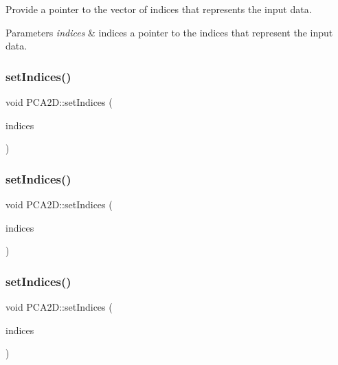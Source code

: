Provide a pointer to the vector of indices that represents the input data. 


\begin{DoxyParams}{Parameters}
{\em indices} & indices a pointer to the indices that represent the input data. \\
\hline
\end{DoxyParams}
\mbox{\label{classPCA2D_a0b214db07c98537f683bb69a7e9d9271}} 
\subsubsection{\texorpdfstring{set\+Indices()}{setIndices()}\hspace{0.1cm}{\footnotesize\ttfamily [7/10]}}
{\footnotesize\ttfamily void P\+C\+A2\+D\+::set\+Indices (\begin{DoxyParamCaption}\item[{const pcl\+::\+Point\+Indices\+Ptr \&}]{indices }\end{DoxyParamCaption})\hspace{0.3cm}{\ttfamily [inline]}}

\mbox{\label{classPCA2D_a51c7a6bcf7c77af6d81d98a0bb0186a6}} 
\subsubsection{\texorpdfstring{set\+Indices()}{setIndices()}\hspace{0.1cm}{\footnotesize\ttfamily [8/10]}}
{\footnotesize\ttfamily void P\+C\+A2\+D\+::set\+Indices (\begin{DoxyParamCaption}\item[{const pcl\+::\+Point\+Indices\+Const\+Ptr \&}]{indices }\end{DoxyParamCaption})\hspace{0.3cm}{\ttfamily [inline]}}

\mbox{\label{classPCA2D_a4e7f046e1198928994dfc40a4c3be40e}} 
\subsubsection{\texorpdfstring{set\+Indices()}{setIndices()}\hspace{0.1cm}{\footnotesize\ttfamily [9/10]}}
{\footnotesize\ttfamily void P\+C\+A2\+D\+::set\+Indices (\begin{DoxyParamCaption}\item[{const boost\+::shared\+\_\+ptr$<$ std\+::vector$<$ int $>$$>$ \&}]{indices }\end{DoxyParamCaption})\hspace{0.3cm}{\ttfamily [inline]}}

